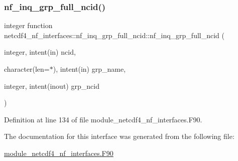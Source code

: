 \subsubsection{\texorpdfstring{nf\+\_\+inq\+\_\+grp\+\_\+full\+\_\+ncid()}{nf\_inq\_grp\_full\_ncid()}}
{\footnotesize\ttfamily integer function netcdf4\+\_\+nf\+\_\+interfaces\+::nf\+\_\+inq\+\_\+grp\+\_\+full\+\_\+ncid\+::nf\+\_\+inq\+\_\+grp\+\_\+full\+\_\+ncid (\begin{DoxyParamCaption}\item[{integer, intent(in)}]{ncid,  }\item[{character(len=$\ast$), intent(in)}]{grp\+\_\+name,  }\item[{integer, intent(inout)}]{grp\+\_\+ncid }\end{DoxyParamCaption})}



Definition at line 134 of file module\+\_\+netcdf4\+\_\+nf\+\_\+interfaces.\+F90.



The documentation for this interface was generated from the following file\+:\begin{DoxyCompactItemize}
\item 
\hyperlink{module__netcdf4__nf__interfaces_8F90}{module\+\_\+netcdf4\+\_\+nf\+\_\+interfaces.\+F90}\end{DoxyCompactItemize}
